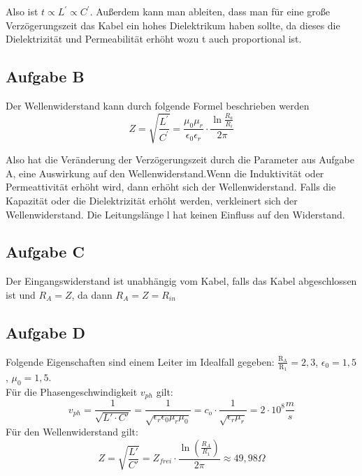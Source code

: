 \documentclass{article}
\begin{document}
Also ist $t \propto L^{\prime}\propto C^{\prime}$. Außerdem kann man ableiten, dass man für eine große Verzögerungszeit das Kabel ein hohes Dielektrikum haben sollte, da dieses die Dielektrizität und Permeabilität erhöht wozu t auch proportional ist. 


\subsection*{Aufgabe B}
Der Wellenwiderstand kann durch folgende Formel beschrieben werden 
\begin{equation}
    Z = \sqrt{\frac{L^{\prime}}{C^{\prime}}} = \frac{\mu_0 \mu_r}{\epsilon_0\epsilon_r}\cdot \frac{\ln{\frac{R_a}{R_i}}}{2\pi}
\end{equation}

Also hat die Veränderung der Verzögerungszeit durch die Parameter aus Aufgabe A, eine Auswirkung auf den Wellenwiderstand.Wenn die Induktivität oder Permeattivität erhöht wird, dann erhöht sich der Wellenwiderstand. Falls die Kapazität oder die Dielektrizität erhöht werden, verkleinert sich der Wellenwiderstand. Die Leitungslänge l hat keinen Einfluss auf den Widerstand.


\subsection*{Aufgabe C}
Der Eingangswiderstand ist unabhängig vom Kabel, falls das Kabel abgeschlossen ist und $R_A = Z$, da dann $R_A = Z= R_{in}$


\subsection*{Aufgabe D}

Folgende Eigenschaften sind einem Leiter im Idealfall gegeben: $\frac{\mathrm{R_A}}{\mathrm{R_1}} = 2,3$, $\epsilon_0 = 1,5$, $\mu_0 = 1,5$. 
\\
Für die Phasengeschwindigkeit $v_{ph}$ gilt: 
\begin{equation*}
    v_{ph} = \frac{1}{\sqrt{L'\cdot C'}} = \frac{1}{\sqrt{\epsilon_r \epsilon_0 \mu_r \mu_0}} = c_o \cdot \frac{1}{\sqrt{\epsilon_r \mu_r}} = 2 \cdot 10^8  \frac{m}{s} 
\end{equation*}
Für den Wellenwiderstand gilt:
\begin{equation}
    Z = \sqrt{{\frac{L'}{C'}}} = Z_{frei} \cdot \frac{\ln(\frac{R_A}{R_1})}{2\pi} \approx 49,98\Omega
\end{equation}
\end{document}
